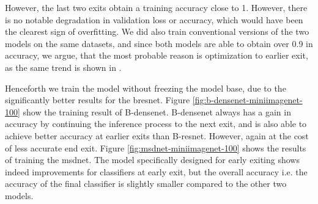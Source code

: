 However, the last two exits obtain a training accuracy close to 1. However, there is no notable degradation in validation loss or accuracy, which would have been the clearest sign of overfitting. We did also train conventional versions of the two models on the same datasets, and since both models are able to obtain over 0.9 in accuracy, we argue, that the most probable reason is optimization to earlier exit, as the same trend is shown in \cite{huang_multi-scale_2017}.

Henceforth we train the model without freezing the model base, due to the significantly better results for the \gls{bresnet}. Figure \ref{fig:b-densenet-miniimagenet-100} show the training result of B-\gls{densenet}. B-\gls{densenet} always has a gain in accuracy by continuing the inference process to the next exit, and is also able to achieve better accuracy at earlier exits than B-\gls{resnet}. However, again at the cost of less accurate end exit. Figure \ref{fig:msdnet-miniimagenet-100} shows the results of training the \gls{msdnet}. The model specifically designed for early exiting shows indeed improvements for classifiers at early exit, but the overall accuracy i.e. the accuracy of the final classifier is slightly smaller compared to the other two models.

